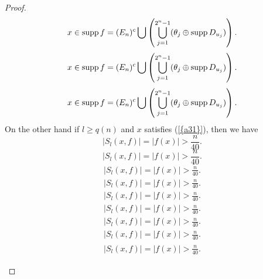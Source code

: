 \documentclass{amsart}
\numberwithin{equation}{section}
\begin{document}
\begin{proof}
{\begin{multline}\label{a31}
x\in {{\rm supp\,}} f=(E_n)^c\bigcup\left(\bigcup_{j=1}^{2^n-1}(\theta_j\oplus {{\rm supp\,}} D_{u_j})\right).
\end{multline}\fi  
{}\begin{multline*}\begin{split}\label{a31}
x\in {{\rm supp\,}} f=(E_n)^c\bigcup\left(\bigcup_{j=1}^{2^n-1}(\theta_j\oplus {{\rm supp\,}} D_{u_j})\right).
\end{split}\end{multline*}\fi
{}\begin{multline}\begin{split}\label{a31}
x\in {{\rm supp\,}} f=(E_n)^c\bigcup\left(\bigcup_{j=1}^{2^n-1}(\theta_j\oplus {{\rm supp\,}} D_{u_j})\right).
\end{split}\end{multline}\fi
}
On the other hand if $l\ge q(n)$ and $x$ satisfies {(\ref{{a31}})}, then we have
{
\begin{equation*} 
|S_l(x,f)|=|f(x)|> \frac{n}{40}.
 \end{equation*}\fi  
{}\begin{equation}
|S_l(x,f)|=|f(x)|> \frac{n}{40}.
\end{equation}\fi   
{}\begin{align*}
|S_l(x,f)|=|f(x)|> \frac{n}{40}.
\end{align*}\fi   
{}\begin{align}
|S_l(x,f)|=|f(x)|> \frac{n}{40}.
\end{align}\fi    
{}\begin{gather*}
|S_l(x,f)|=|f(x)|> \frac{n}{40}.
\end{gather*}\fi  
{}\begin{gather}
|S_l(x,f)|=|f(x)|> \frac{n}{40}.
\end{gather}\fi   
{}\begin{multline*}
|S_l(x,f)|=|f(x)|> \frac{n}{40}.
\end{multline*}\fi  
{}\begin{multline}
|S_l(x,f)|=|f(x)|> \frac{n}{40}.
\end{multline}\fi  
{}\begin{multline*}\begin{split}
|S_l(x,f)|=|f(x)|> \frac{n}{40}.
\end{split}\end{multline*}\fi
{}\begin{multline}\begin{split}

\end{split}
\end{multline}}
\end{proof}
\end{document}
